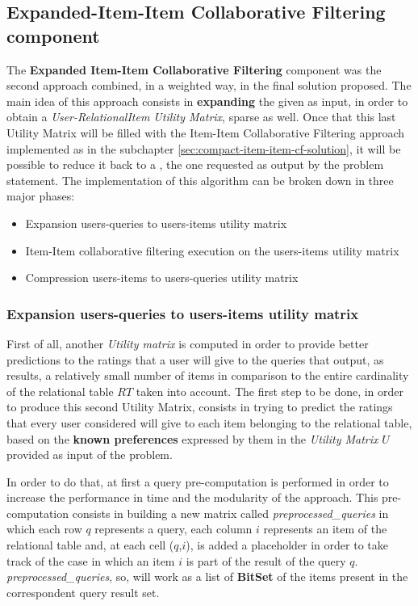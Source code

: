 \subsection{Expanded-Item-Item Collaborative Filtering component}
\label{sec:expansion}
The \textbf{Expanded Item-Item Collaborative Filtering} component was the second approach combined, in a weighted way, in the final solution proposed. The main idea of this approach consists in \textbf{expanding} the  given as input, in order to obtain a \textit{User-RelationalItem Utility Matrix}, sparse as well. Once that this last Utility Matrix will be filled with the Item-Item Collaborative Filtering approach implemented as in the subchapter \ref{sec:compact-item-item-cf-solution}, it will be possible to reduce it back to a , the one requested as output by the problem statement. The implementation of this algorithm can be broken down in three major phases:
\begin{itemize}
    \item Expansion users-queries to users-items utility matrix
    \item Item-Item collaborative filtering execution on the users-items utility matrix
    \item Compression users-items to users-queries utility matrix
\end{itemize}

\subsubsection{Expansion users-queries to users-items utility matrix}
\label{sub:expansion}
First of all, another \textit{Utility matrix} is computed in order to provide better predictions to the ratings that a user will give to the queries that output, as results, a relatively small number of items in comparison to the entire cardinality of the relational table $RT$ taken into account. The first step to be done, in order to produce this second Utility Matrix, consists in trying to predict the ratings that every user considered will give to each item belonging to the relational table, based on the \textbf{known preferences} expressed by them in the \textit{Utility Matrix} $U$ provided as input of the problem.

In order to do that, at first a query pre-computation is performed in order to increase the performance in time and the modularity of the approach. This pre-computation consists in building a new matrix called \textit{preprocessed\_queries} in which each row $q$ represents a query, each column $i$ represents an item of the relational table and, at each cell ($q$,$i$), is added a placeholder in order to take track of the case in which an item $i$ is part of the result of the query $q$. \textit{preprocessed\_queries}, so, will work as a list  of \textbf{BitSet} of the items present in the correspondent query result set.


